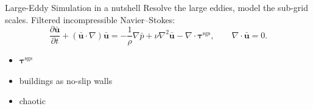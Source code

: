 \documentclass[aspectratio=169,11pt]{beamer}
\begin{document}


\begin{frame}{Large-Eddy Simulation in a nutshell}
  Resolve the large eddies, model the sub-grid scales. Filtered
  incompressible Navier--Stokes:
  \[
    \frac{\partial \bar{\bm{u}}}{\partial t}
    + (\bar{\bm{u}}\!\cdot\!\nabla)\bar{\bm{u}}
    = -\frac{1}{\rho}\nabla \bar{p}
    + \nu\nabla^{2}\bar{\bm{u}}
    - \nabla\!\cdot\!\bm{\tau}^{\mathrm{sgs}},
    \qquad \nabla\!\cdot\!\bar{\bm{u}} = 0 .
  \]
  \begin{itemize}\setlength\itemsep{3pt}
    \item {} $\bm{\tau}^{\mathrm{sgs}}$
    \item buildings as no-slip walls
    \item chaotic
  \end{itemize}
\end{frame}
\end{document}
